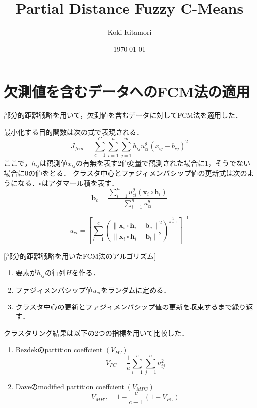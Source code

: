 \documentclass[dvipdfmx]{ujarticle}
\begin{document}
\author{Koki Kitamori}
\title{Partial Distance Fuzzy C-Means}
\date{\today}
\maketitle
\section{欠測値を含むデータへのFCM法の適用}
部分的距離戦略を用いて，欠測値を含むデータに対してFCM法を適用した．

最小化する目的関数は次の式で表現される．
\begin{equation}
    J_{fcm} = \sum_{c=1}^C \sum_{i=1}^{n} \sum_{j=1}^m h_{ij} u_{ci}^{\theta} (x_{ij}-b_{cj})^2
\end{equation}
ここで，$h_{ij}$は観測値$x_{ij}$の有無を表す2値変量で観測された場合に1，そうでない場合に0の値をとる．
クラスタ中心とファジィメンバシップ値の更新式は次のようになる．$\circ$はアダマール積を表す．
\begin{equation}
    \boldsymbol{b}_c = \frac{\sum_{i=1}^nu_{ci}^\theta (\boldsymbol{x}_i \circ \boldsymbol{h}_i)}{\sum_{i=1}^nu_{ci}^\theta}
\end{equation}

\begin{equation}
    u_{c i}=\left[\sum_{l=1}^{c}\left(\frac{\left\|\boldsymbol{x}_{i} \circ \boldsymbol{h}_i-\boldsymbol{b}_{c}\right\|^{2}}{\left\|\boldsymbol{x}_{i} \circ \boldsymbol{h}_i-\boldsymbol{b}_{l}\right\|^{2}}\right)^{\frac{1}{\theta-1}}\right]^{-1}
\end{equation}

[部分的距離戦略を用いたFCM法のアルゴリズム]
\begin{enumerate}
    \item 要素が$h_{ij}$の行列$H$を作る．
    \item ファジィメンバシップ値$u_{ci}$をランダムに定める．
    \item クラスタ中心の更新とファジィメンバシップ値の更新を収束するまで繰り返す．
\end{enumerate}

クラスタリング結果は以下の2つの指標を用いて比較した．
\begin{enumerate}
    \item Bezdekのpartition coeffcient $(V_{PC})$
     \begin{equation}
         V_{PC} = \frac{1}{n}\sum_{i=1}^{c}\sum_{j=1}^{n}u_{ij}^2
    \end{equation}
    \item Daveのmodified partition coeffcient $(V_{MPC})$
\begin{equation}
    V_{MPC} = 1-\frac{c}{c-1}(1-V_{PC})
\end{equation}
\end{enumerate}
\end{document}
